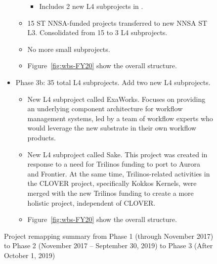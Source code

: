 \begin{figure}
\begin{mdframed}
\begin{itemize}
\begin{itemize}
\begin{itemize}
	\item Includes 2 new L4 subprojects in \ecosystem.
	\end{itemize}
	\item 15 ST NNSA-funded projects transferred to new NNSA ST L3. Consolidated from 15 to 3 L4 subprojects.
	\item No more small subprojects.
	\item Figure~\ref{fig:wbs-FY20} show the overall structure.
\end{itemize}
\item Phase 3b: 35 total L4 subprojects.  Add two new L4 subprojects.
\begin{itemize}
	\item New L4 subproject called ExaWorks.  Focuses on providing an underlying component architecture for workflow management systems, led by a team of workflow experts who would leverage the new substrate in their own workflow products.
	\item New L4 subproject called Sake.  This project was created in response to a need for Trilinos funding to port to Aurora and Frontier.  At the same time, Trilinos-related activities in the CLOVER project, specifically Kokkos Kernels, were merged with the new Trilinos funding to create a more holistic project, independent of CLOVER.
	\item Figure~\ref{fig:wbs-FY20} show the overall structure.
\end{itemize}
\end{itemize}
\end{mdframed}

\caption{\label{fig:project-remapping}Project remapping summary from Phase 1 (through November 2017) to Phase 2 (November 2017 -- September 30, 2019) to Phase 3 (After October 1, 2019)}
\end{figure}


